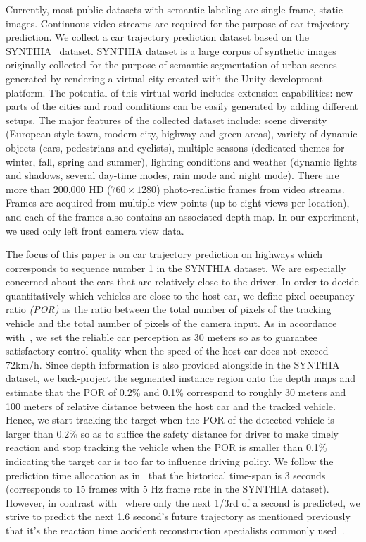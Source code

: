 \documentclass[10pt,twocolumn,letterpaper]{article}
\begin{document}
Currently, most public datasets with semantic labeling are single frame, static images. Continuous video streams are required for the purpose of car trajectory prediction.
We collect a car trajectory prediction dataset based on the SYNTHIA~\cite{ros2016synthia} dataset.
SYNTHIA dataset is a large corpus of synthetic images originally collected for the purpose of semantic segmentation of urban scenes generated by rendering a virtual city created with the Unity development platform.
The potential of this virtual world includes extension capabilities: new parts of the cities and road conditions can be easily generated by adding different setups. The major features of the collected dataset include: scene diversity (European style town, modern city, highway and green areas), variety of dynamic objects (cars, pedestrians and cyclists), multiple seasons (dedicated themes for winter, fall, spring and summer), lighting conditions and weather (dynamic lights and shadows, several day-time modes, rain mode and night mode).
There are more than 200,000 HD ($760\times1280$) photo-realistic frames from video streams.
Frames are acquired from multiple view-points (up to eight views per location), and each of the frames also contains an associated depth map. In our experiment, we used only left front camera view data.

The focus of this paper is on car trajectory prediction on highways which corresponds to sequence number 1 in the SYNTHIA dataset. We are especially concerned about the cars that are relatively close to the driver.
In order to decide quantitatively which vehicles are close to the host car, we define pixel occupancy ratio \emph{(POR)} as the ratio between the total number of pixels of the tracking vehicle and the total number of pixels of the camera input.
As in accordance with~\cite{chen2015deepdriving}, we set the reliable car perception as 30 meters so as to guarantee satisfactory control quality when the speed of the host car does not exceed 72km/h.
Since depth information is also provided alongside in the SYNTHIA dataset, we back-project the segmented instance region onto the depth maps and estimate that the POR of 0.2\% and 0.1\% correspond to roughly 30 meters and 100 meters of relative distance between the host car and the tracked vehicle.
Hence, we start tracking the target when the POR of the detected vehicle is larger than 0.2\%  so as to suffice the safety distance for driver to make timely reaction and stop tracking the vehicle when the POR is smaller than 0.1\% indicating the target car is too far to influence driving policy.
We follow the prediction time allocation as in~\cite{xu2017end} that the historical time-span is 3 seconds (corresponds to 15 frames with 5 Hz frame rate in the SYNTHIA dataset).
However, in contrast with~\cite{xu2017end} where only the next 1/3rd of a second is predicted, we strive to predict the next 1.6 second's future trajectory as mentioned previously that it's the reaction time accident reconstruction specialists commonly used~\cite{mcgehee2000driver}.
\end{document}
